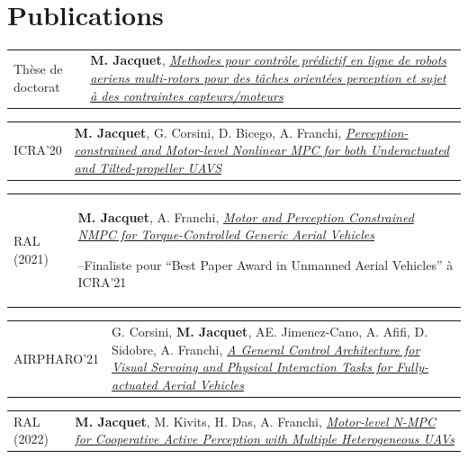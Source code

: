 \documentclass[10pt]{article}
\newlength{\annee}
\newlength{\texte}
\begin{document}
\vfill
{}

\newpage
~\\[0.2cm]
\section{Publications}

\begin{tabular}{@{}p{\annee}p{\texte}@{}}
	\small
	Thèse de doctorat	& {\bf M. Jacquet}, \href{https://theses.fr/2022ISAT0021}{\it Methodes pour contrôle prédictif en ligne de robots aeriens multi-rotors pour des tâches orientées perception et sujet à des contraintes capteurs/moteurs}
\end{tabular} \par
\begin{tabular}{@{}p{\annee}p{\texte}@{}}
	\small
	ICRA'20				& {\bf M. Jacquet}, G. Corsini, D. Bicego, A. Franchi, \href{https://doi.org/10.1109/ICRA40945.2020.9197281}{\it Perception-constrained and Motor-level Nonlinear MPC for both Underactuated and Tilted-propeller UAVS}
\end{tabular} \par
\begin{tabular}{@{}p{\annee}p{\texte}@{}}
	\small
	RAL	(2021)			& {\bf M. Jacquet}, A. Franchi, \href{https://doi.org/10.1109/LRA.2020.3045654}{\it Motor and Perception Constrained NMPC for Torque-Controlled Generic Aerial Vehicles} \par
						--Finaliste pour ``Best Paper Award in Unmanned Aerial Vehicles'' à ICRA'21
\end{tabular} \par
\begin{tabular}{@{}p{\annee}p{\texte}@{}}
	\small
	AIRPHARO'21			& G. Corsini, {\bf M. Jacquet}, AE. Jimenez-Cano, A. Afifi, D. Sidobre, A. Franchi, \href{https://doi.org/10.1109/AIRPHARO52252.2021.9571053}{\it A General Control Architecture for Visual Servoing and Physical Interaction Tasks for Fully-actuated Aerial Vehicles}
\end{tabular} \par
\begin{tabular}{@{}p{\annee}p{\texte}@{}}
	\small
	RAL (2022)			& {\bf M. Jacquet}, M. Kivits, H. Das, A. Franchi, \href{https://doi.org/10.1109/LRA.2022.3143218}{\it Motor-level N-MPC for Cooperative Active Perception with Multiple Heterogeneous UAVs}
\end{tabular} \par
\end{document}
